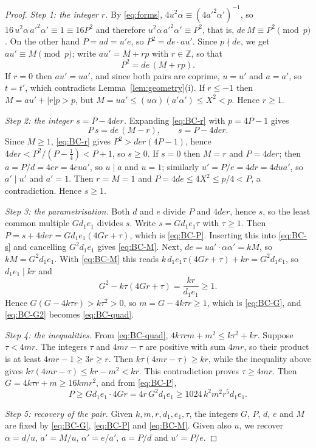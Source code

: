\documentclass[aps,prd,twocolumn,superscriptaddress,nofootinbib,longbibliography,floatfix,showkeys,nobalancelastpage,amsmath,amssymb,10pt]{revtex4-2}
\theoremstyle{plain}
\theoremstyle{definition}
\theoremstyle{plain}
\begin{document}
\begin{proof}
\emph{Step 1: the integer $r$.} By \eqref{eq:forms}, $4u^2\alpha\equiv(4a'^2\alpha')^{-1}$, so $16\,u^2\alpha\,a'^2\alpha'\equiv1\equiv16P^2$ and therefore $u^2\alpha\,a'^2\alpha'\equiv P^2$, that is, $de\,M\equiv P^2\pmod p$. On the other hand $P=ad=u'e$, so $P^2=de\cdot au'$. Since $p\nmid de$, we get $au'\equiv M\pmod p$; write $au'=M+rp$ with $r\in\mathbb{Z}$, so that
\begin{equation}\label{eq:BC-r}
P^2=de\,(M+rp).
\end{equation}
If $r=0$ then $au'=ua'$, and since both pairs are coprime, $u=u'$ and $a=a'$, so $t=t'$, which contradicts Lemma~\ref{lem:geometry}(i). If $r\le-1$ then $M=au'+|r|p>p$, but $M=ua'\le(u\alpha)(a'\alpha')\le X^2<p$. Hence $r\ge1$.

\emph{Step 2: the integer $s=P-4der$.} Expanding \eqref{eq:BC-r} with $p=4P-1$ gives
\begin{equation}\label{eq:BC-s}
P\,s=de\,(M-r),\qquad s=P-4der.
\end{equation}
Since $M\ge1$, \eqref{eq:BC-r} gives $P^2>der(4P-1)$, hence $4der<P^2/(P-\frac14)<P+1$, so $s\ge0$. If $s=0$ then $M=r$ and $P=4der$; then $a=P/d=4er=4eua'$, so $u\mid a$ and $u=1$; similarly $u'=P/e=4dr=4dua'$, so $a'\mid u'$ and $a'=1$. Then $r=M=1$ and $P=4de\le4X^2\le p/4<P$, a contradiction. Hence $s\ge1$.

\emph{Step 3: the parametrisation.} Both $d$ and $e$ divide $P$ and $4der$, hence $s$, so the least common multiple $Gd_1e_1$ divides $s$. Write $s=Gd_1e_1\tau$ with $\tau\ge1$. Then $P=s+4der=Gd_1e_1(4Gr+\tau)$, which is \eqref{eq:BC-P}. Inserting this into \eqref{eq:BC-s} and cancelling $G^2d_1e_1$ gives \eqref{eq:BC-M}. Next, $de=ua'\cdot\alpha\alpha'=kM$, so $kM=G^2d_1e_1$. With \eqref{eq:BC-M} this reads $k\,d_1e_1\tau(4Gr+\tau)+kr=G^2d_1e_1$, so $d_1e_1\mid kr$ and
\begin{equation}\label{eq:BC-G2}
G^2-k\tau(4Gr+\tau)=\frac{kr}{d_1e_1}\ge1.
\end{equation}
Hence $G(G-4k\tau r)>k\tau^2>0$, so $m=G-4k\tau r\ge1$, which is \eqref{eq:BC-G}, and \eqref{eq:BC-G2} becomes \eqref{eq:BC-quad}.

\emph{Step 4: the inequalities.} From \eqref{eq:BC-quad}, $4k\tau rm+m^2\le k\tau^2+kr$. Suppose $\tau<4mr$. The integers $\tau$ and $4mr-\tau$ are positive with sum $4mr$, so their product is at least $4mr-1\ge3r\ge r$. Then $k\tau(4mr-\tau)\ge kr$, while the inequality above gives $k\tau(4mr-\tau)\le kr-m^2<kr$. This contradiction proves $\tau\ge4mr$. Then $G=4k\tau r+m\ge16kmr^2$, and from \eqref{eq:BC-P},
\[
P\ge Gd_1e_1\cdot4Gr=4r\,G^2d_1e_1\ge1024\,k^2m^2r^5d_1e_1.
\]

\emph{Step 5: recovery of the pair.} Given $k,m,r,d_1,e_1,\tau$, the integers $G$, $P$, $d$, $e$ and $M$ are fixed by \eqref{eq:BC-G}, \eqref{eq:BC-P} and \eqref{eq:BC-M}. Given also $u$, we recover $\alpha=d/u$, $a'=M/u$, $\alpha'=e/a'$, $a=P/d$ and $u'=P/e$.
\end{proof}
\end{document}
